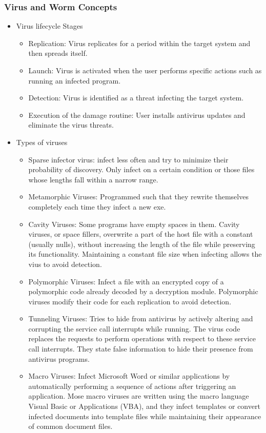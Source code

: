 \subsubsection{Virus and Worm Concepts}
\begin{itemize}
    \item Virus lifecycle Stages
    \begin{itemize}
        \item Replication: Virus replicates for a period within the target system and then spreads itself.
        \item Launch: Virus is activated when the user performs specific actions such as running an infected program.
        \item Detection: Virus is identified as a threat infecting the target system.
        \item Execution of the damage routine: User installs antivirus updates and eliminate the virus threats.
    \end{itemize}
    \item Types of viruses
    \begin{itemize}
        \item Sparse infector virus: infect less often and try to minimize their probability of discovery. Only infect on a certain condition or those files whose lengths fall within a narrow range.
        \item Metamorphic Viruses: Programmed such that they rewrite themselves completely each time they infect a new exe.
        \item Cavity Viruses: Some programs have empty spaces in them. Cavity viruses, or space fillers, overwrite a part of the host file with a constant (usually nulls), without increasing the length of the file while preserving its functionality. Maintaining a constant file size when infecting allows the vius to avoid detection.
        \item Polymorphic Viruses: Infect a file with an encrypted copy of a polymorphic code already decoded by a decryption module. Polymorphic viruses modify their code for each replication to avoid detection.
        \item Tunneling Viruses: Tries to hide from antivirus by actively altering and corrupting the service call interrupts while running. The virus code replaces the requests to perform operations with respect to these service call interrupts. They state false information to hide their presence from antivirus programs.
        \item Macro Viruses: Infect Microsoft Word or similar applications by automatically performing a sequence of actions after triggering an application. Mose macro viruses are written using the macro language Visual Basic or Applications (VBA), and they infect templates or convert infected documents into template files while maintaining their appearance of common document files.

\end{itemize}
\end{itemize}
